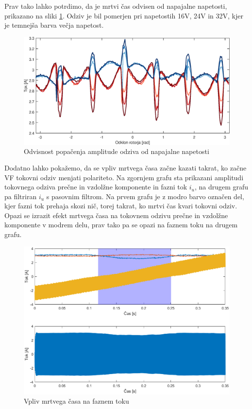 \documentclass[a4paper,twoside,openright,12pt,slovene]{book}
\begin{document}
Prav tako lahko potrdimo, da je mrtvi čas odvisen od napajalne napetosti, prikazano na sliki \ref{mrtviCasNapetost}. Odziv je bil pomerjen pri napetostih 16V, 24V in 32V, kjer je temnejša barva večja
napetost.

\begin{figure}[!htbp]
    \centering
    \includegraphics[width=0.95\columnwidth]{Slike/mrtviCasNapetost.eps}
    \caption{\label{mrtviCasNapetost} Odvisnost popačenja amplitude odziva od napajalne napetosti }
\end{figure}

Dodatno lahko pokažemo, da se vpliv mrtvega časa začne kazati takrat, ko začne VF tokovni odziv menjati polariteto. Na zgornjem grafu sta prikazani amplitudi tokovnega odziva prečne in vzdolžne
komponente in fazni tok $i_u$, na drugem grafu pa filtriran $i_u$ s pasovnim filtrom. Na prvem grafu je z modro barvo označen del, kjer fazni tok prehaja skozi nič, torej takrat, ko mrtvi čas kvari
tokovni odziv. Opazi se izrazit efekt mrtvega časa na tokovnem odzivu prečne in vzdolžne komponente v modrem delu, prav tako pa se opazi na faznem toku na drugem grafu.

\begin{figure}[!htbp]
    \centering
    \includegraphics[width=1\columnwidth]{Slike/mrtviCasFazniTok.eps}
    \caption{\label{mrtviCasFazniTok} Vpliv mrtvega časa na faznem toku }
\end{figure}
\end{document}
